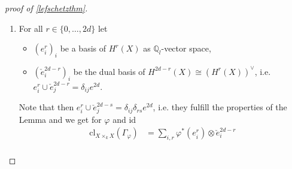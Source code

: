 \documentclass[english]{scrartcl}
\theoremstyle{definition}
\newtheorem{Lem}[Def]{Lemma}
\theoremstyle{remark}
\newcommand*{\Z}{\mathds{Z}}
\newcommand*{\Q}{\mathds{Q}}
\newcommand*{\Zl}{\Z_l} %
\newcommand*{\Ql}{\Q_l} %
\newcommand*{\End}[1]{\text{End}(#1)} %
\newcommand*{\id}{\text{id}} %
\newcommand*{\tr}[1]{\text{tr}\left(#1\right)} %
\newcommand*{\Graph}[1]{\Gamma_{#1}} %
\newcommand*{\cl}[2]{\text{cl}_{#1}\left(#2\right)} %
\newcommand*{\one}[1]{1_{#1}}%
\let\altphi\phi
\renewcommand*{\phi}{\varphi}
\begin{document}
\begin{proof}[proof of \autoref{lefschetzthm}]
\begin{enumerate}[label={Step \arabic*.}]
\begin{Lem}
      and $\altphi\in\End(X)$ regular.
      Write $e^{2d}\in H^{2d}(X)$ for the canonical generator
      with $\tr{e^{2d}}=1\in\Ql$.
      Furthermore, let $(b_k)_k$ be a basis of $H^*(X)$ as
      $\Ql$-vector space and $(f_k)_k$ be the dual Basis with respect
      to the cup product, i.e. $b_k\cup f_l=\delta_{kl}e^{2d}$.
      Then
      \begin{gather*}
        \cl{X\times_k X}{\Graph{\phi}} =
        \sum_{k}^{2d} \phi^*(b_k)\otimes  f_k
      \end{gather*}
      \begin{proof}
        By the  %
        $H^*(X\otimes X) \cong H^*(X)\otimes_{\Ql}H^*(X)$ is a
        $H^*(X)$-module with basis
        $(\one{X}\otimes f_k)_{k}$.
        Therefore, there are unique factors $a_{k}$ in $H^*(X)$ s.t.
        \begin{gather}
          \label{eq:step2}
        \cl{X\times_k Y}{\Graph{\phi}} =
        \sum_{k} a_k\otimes f_k
      \end{gather}
      Explicitly
      \begin{align*}
        a_j
        = p_*(a_j\otimes e^{2d})
        &= p_*\Big(
          \sum_k(a_k\otimes f_k)\cup (\one{X}\otimes b_j)
        \Big)\\
        &\overset{\mathllap{\eqref{eq:step2}}}= p_*\left(
          \cl{X\times_k X}{\Graph{\phi}} \cup q^*(b_j)
          \right)\\
        &\overset{\mathllap{\ref{step1}}}= \phi^*(b_j) 
      \end{align*}
      \end{proof}
    \end{Lem}
  \item
  For all $r\in\{0,\dotsc,2d\}$ let
  \begin{itemize}
  \item $(e_i^r)_{i}$ be a basis of $H^r(X)$ as $\Ql$-vector space,
  \item $(\check e_i^{2d-r})_{i}$ be the dual basis of $H^{2d-r}(X)\cong (H^{r}(X))^\vee$,
    i.e. $e^r_i\cup \check e_j^{2d-r}= \delta_{ij}e^{2d}$.
  \end{itemize}
  Note that then $e^r_i\cup \check e_j^{2d-s}=\delta_{ij}\delta_{rs}e^{2d}$,
  i.e. they fulfill the properties of the Lemma
  and we get for $\phi$ and $\id$
  \begin{align*}
    \cl{X\times_k X}{\Graph{\phi}}
    &= \sum_{i,r} \phi^*(e_i^r)\otimes \check e_i^{2d-r}\\

\end{align*}
\end{enumerate}
\end{proof}
\end{document}
